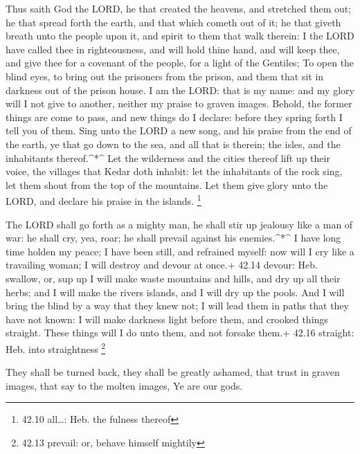  Thus saith God the LORD, he that created the heavens, and
stretched them out; he that spread forth the earth, and that which
cometh out of it; he that giveth breath unto the people upon it, and
spirit to them that walk therein:  I the LORD have called
thee in righteousness, and will hold thine hand, and will keep thee, and
give thee for a covenant of the people, for a light of the Gentiles;
 To open the blind eyes, to bring out the prisoners from the
prison, and them that sit in darkness out of the prison house.
 I am the LORD: that is my name: and my glory will I not
give to another, neither my praise to graven images. 
Behold, the former things are come to pass, and new things do I declare:
before they spring forth I tell you of them.  Sing unto the
LORD a new song, and his praise from the end of the earth, ye that go
down to the sea, and all that is therein; the isles, and the inhabitants
thereof.\^{}*\^{}  Let the wilderness and the cities
thereof lift up their voice, the villages that Kedar doth inhabit: let
the inhabitants of the rock sing, let them shout from the top of the
mountains.  Let them give glory unto the LORD, and declare
his praise in the islands. \footnote{42.10 all\ldots: Heb. the fulness
  thereof}

 The LORD shall go forth as a mighty man, he shall stir up
jealousy like a man of war: he shall cry, yea, roar; he shall prevail
against his enemies.\^{}*\^{}  I have long time holden my
peace; I have been still, and refrained myself: now will I cry like a
travailing woman; I will destroy and devour at once.+ 42.14 devour: Heb.
swallow, or, sup up  I will make waste mountains and hills,
and dry up all their herbs; and I will make the rivers islands, and I
will dry up the pools.  And I will bring the blind by a way
that they knew not; I will lead them in paths that they have not known:
I will make darkness light before them, and crooked things straight.
These things will I do unto them, and not forsake them.+ 42.16 straight:
Heb. into straightness \footnote{42.13 prevail: or, behave himself
  mightily}

 They shall be turned back, they shall be greatly ashamed,
that trust in graven images, that say to the molten images, Ye are our
gods.

